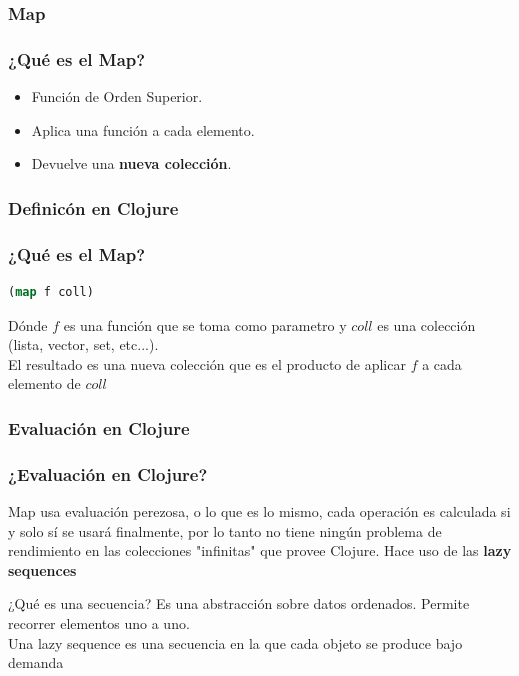 \documentclass{beamer}
\begin{document}

\subsubsection{Map}
\begin{frame}[fragile]
    \frametitle{¿Qué es el Map?}
    \begin{itemize}
        \item Función de Orden Superior.
        \item Aplica una función a cada elemento.
        \item Devuelve una \textbf{nueva colección}.
    \end{itemize}
\end{frame}
\subsubsection{Definicón en Clojure}
\begin{frame}[fragile]
    \frametitle{¿Qué es el Map?}
    \begin{center}
    \begin{lstlisting}[language=Clojure]
    (map f coll)  
    \end{lstlisting}
    \end{center}
    Dónde $f$ es una función que se toma como parametro y $coll$ es una colección (lista, vector, set, etc...).\\
    El resultado es una nueva colección que es el producto de aplicar $f$ a cada elemento
    de $coll$
    
\end{frame}

\subsubsection{Evaluación en Clojure}
\begin{frame}[fragile]
    \frametitle{¿Evaluación en Clojure?}

    Map usa evaluación perezosa, o lo que es lo mismo, cada operación es calculada si 
    y solo sí se usará finalmente, por lo tanto no tiene ningún problema de rendimiento
    en las colecciones "infinitas" que provee Clojure.
    Hace uso de las \textbf{lazy sequences}
    \begin{block}{¿Qué es una secuencia?}
        Es una abstracción sobre datos ordenados.
        Permite recorrer elementos uno a uno.
        \\ 
        Una lazy sequence es una secuencia en la que cada objeto se produce bajo demanda
    \end{block}
\end{frame}
\end{document}

